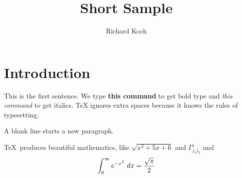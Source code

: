 \documentclass[11pt,oneside]{article}
\title{Short Sample}
\author{Richard Koch}
\begin{document}
    \maketitle
    \section{Introduction} This is the first sentence. We type 
    {\bf this command} to get bold type and 
    {\it this command} to get italics.  TeX ignores       extra 
    spaces because it knows the rules of typesetting.
    
    A blank line starts a new paragraph.
    
    \TeX\ produces beautiful mathematics, like
    $\sqrt{x^2 + 5 x + 6}$ and $\Gamma^i_{j_1 j_2}$ and 
    $$\int_0^\infty e^{- x^2}  \ dx = {{\sqrt{\pi}} \over 2}$$
    
    
\end{document}
